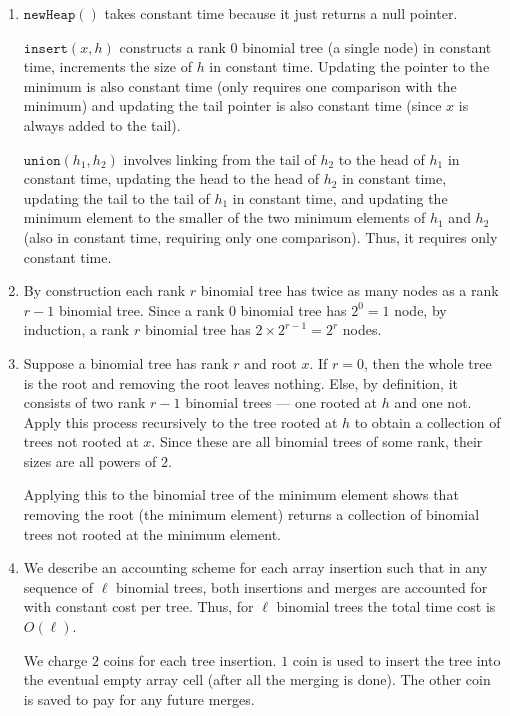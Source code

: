 \documentclass[12 pt, letterpaper]{hmcpset}
\begin{document}
\begin{solution}
	\begin{enumerate}
		\item $\mathtt{newHeap}()$ takes constant time because it just returns a null pointer.

			$\mathtt{insert}(x, h)$ constructs a rank $0$ binomial tree (a single node) in constant time, increments the size of $h$ in constant time. Updating the pointer to the minimum is also constant time (only requires one comparison with the minimum) and updating the tail pointer is also constant time (since $x$ is always added to the tail).

			$\mathtt{union}(h_{1}, h_{2})$ involves linking from the tail of $h_{2}$ to the head of $h_{1}$ in constant time, updating the head to the head of $h_{2}$ in constant time, updating the tail to the tail of $h_{1}$ in constant time, and updating the minimum element to the smaller of the two minimum elements of $h_{1}$ and $h_{2}$ (also in constant time, requiring only one comparison). Thus, it requires only constant time.

		\item By construction each rank $r$ binomial tree has twice as many nodes as a rank $r - 1$ binomial tree. Since a rank $0$ binomial tree has $2^{0} = 1$ node, by induction, a rank $r$ binomial tree has $2 \times 2^{r - 1} = 2^{r}$ nodes.

		\item Suppose a binomial tree has rank $r$ and root $x$. If $r = 0$, then the whole tree is the root and removing the root leaves nothing. Else, by definition, it consists of two rank $r - 1$ binomial trees --- one rooted at $h$ and one not. Apply this process recursively to the tree rooted at $h$ to obtain a collection of trees not rooted at $x$. Since these are all binomial trees of some rank, their sizes are all powers of $2$.

			Applying this to the binomial tree of the minimum element shows that removing the root (the minimum element) returns a collection of binomial trees not rooted at the minimum element.

		\item We describe an accounting scheme for each array insertion such that in any sequence of $\ell$ binomial trees, both insertions and merges are accounted for with constant cost per tree. Thus, for $\ell$  binomial trees the total time cost is $O(\ell)$.

			We charge $2$ coins for each tree insertion. $1$ coin is used to insert the tree into the eventual empty array cell (after all the merging is done). The other coin is saved to pay for any future merges. 


\end{enumerate}
\end{solution}
\end{document}
